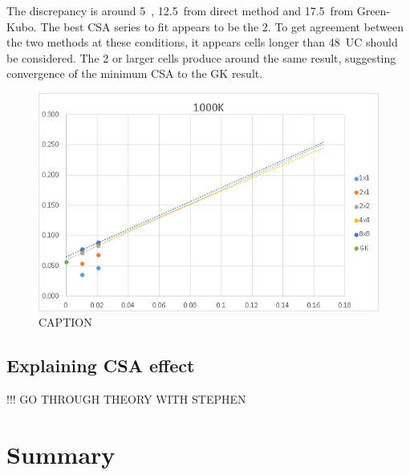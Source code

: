 \pagebreak

The discrepancy is around 5~\wmk, 12.5~\wmks from direct method and 17.5~\wmks from Green-Kubo. The best CSA series to fit appears to be the 2. To get agreement between the two methods at these conditions, it appears cells longer than 48~UC should be considered. The 2 or larger cells produce around the same result, suggesting convergence of the minimum CSA to the GK result.

\begin{figure}[h!]
\includegraphics[width=\linewidth]{Figures/direct_inv_cut-up_1000_01.png}
\caption[direct inv cutup 1000 01]{CAPTION}
\label{fig:direct_inv_cutup_1000_01}
\end{figure}

\pagebreak

\subsection{\label{sec:3.DM.theory}Explaining CSA effect}

!!! GO THROUGH THEORY WITH STEPHEN


 








\section{\label{sec:3.Summary}Summary}


